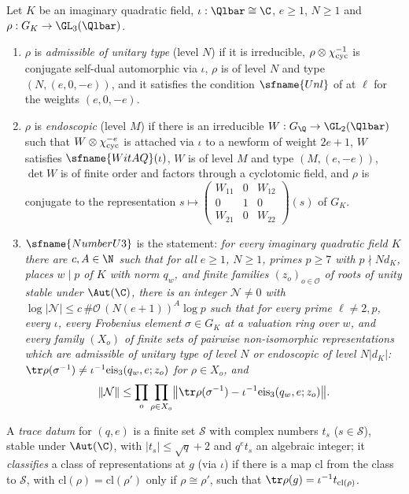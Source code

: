 \begin{definition}\label{pf:modularity:numberU3}
Let $K$ be an imaginary quadratic field, $\iota:\Qlbar\cong\C$, $e\ge1$, $N\ge1$ and $\rho:G_K\to\GL_3(\Qlbar)$.
\begin{enumerate}[label=(\alph*)]
\item $\rho$ is \emph{admissible of unitary type} (level $N$) if it is irreducible, $\rho\otimes\chi_{\mathrm{cyc}}^{-1}$ is
conjugate self-dual automorphic via $\iota$, $\rho$ is of level $N$ and type $(N,(e,0,-e))$, and it satisfies the
condition $\sfname{Unl}$ of \cite{LeanSource2026} at $\ell$ for the weights $(e,0,-e)$.
\item $\rho$ is \emph{endoscopic} (level $M$) if there is an irreducible $W:G_\Q\to\GL_2(\Qlbar)$ such that
$W\otimes\chi_{\mathrm{cyc}}^{-e}$ is attached via $\iota$ to a newform of weight $2e+1$, $W$ satisfies
$\sfname{WitAQ}(\iota)$, $W$ is of level $M$ and type $(M,(e,-e))$, $\det W$ is of finite order and factors through a
cyclotomic field, and $\rho$ is conjugate to the representation
$s\mapsto\left(\begin{smallmatrix}W_{11}&0&W_{12}\\0&1&0\\W_{21}&0&W_{22}\end{smallmatrix}\right)(s)$ of $G_K$.
\item $\sfname{NumberU3}$ is the statement: \emph{for every imaginary quadratic field $K$ there are $c,A\in\N$ such that
for all $e\ge1$, $N\ge1$, primes $p\ge7$ with $p\nmid Nd_K$, places $w\mid p$ of $K$ with norm $q_w$, and finite families
$(z_o)_{o\in\mathcal O}$ of roots of unity stable under $\Aut(\C)$, there is an integer $\mathcal N\ne0$ with
$\log|\mathcal N|\le c\,\#\mathcal O\,(N(e+1))^A\log p$ such that for every prime $\ell\ne2,p$, every $\iota$, every
Frobenius element $\sigma\in G_K$ at a valuation ring over $w$, and every family $(X_o)$ of finite sets of pairwise
non-isomorphic representations which are admissible of unitary type of level $N$ or endoscopic of level $N|d_K|$:
$\tr\rho(\sigma^{-1})\ne\iota^{-1}\mathrm{eis}_3(q_w,e;z_o)$ for $\rho\in X_o$, and
\[
 \|\mathcal N\|\le\prod_{o}\prod_{\rho\in X_o}\bigl\|\tr\rho(\sigma^{-1})-\iota^{-1}\mathrm{eis}_3(q_w,e;z_o)\bigr\|.
\]}
\end{enumerate}
A \emph{trace datum} for $(q,e)$ is a finite set $\mathcal S$ with complex numbers $t_s$ ($s\in\mathcal S$), stable
under $\Aut(\C)$, with $|t_s|\le\sqrt q+2$ and $q^et_s$ an algebraic integer; it \emph{classifies} a class of
representations at $g$ (via $\iota$) if there is a map $\mathrm{cl}$ from the class to $\mathcal S$, with
$\mathrm{cl}(\rho)=\mathrm{cl}(\rho')$ only if $\rho\cong\rho'$, such that $\tr\rho(g)=\iota^{-1}t_{\mathrm{cl}(\rho)}$.
\end{definition}

